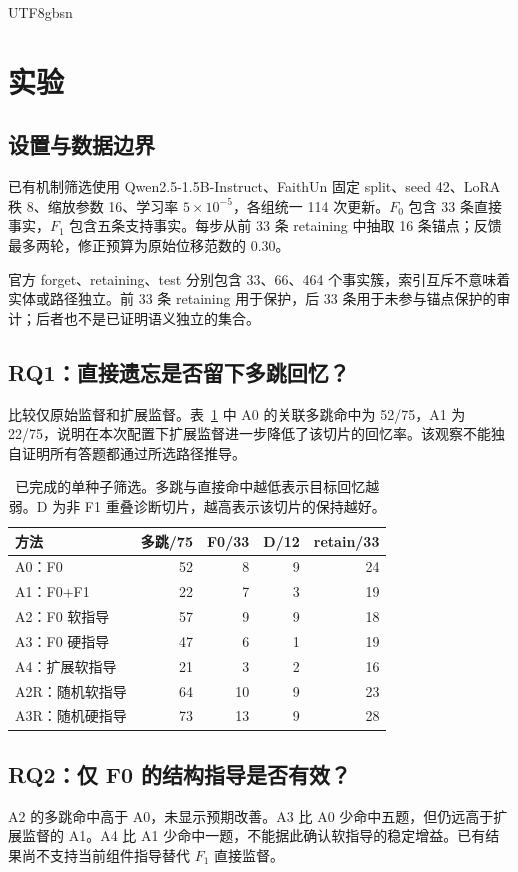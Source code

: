 \documentclass[sigconf,anonymous,review]{acmart}
\begin{document}
\begin{CJK*}{UTF8}{gbsn}
\section{实验}
\subsection{设置与数据边界}
已有机制筛选使用 Qwen2.5-1.5B-Instruct、FaithUn 固定 split、seed 42、LoRA 秩 8、缩放参数 16、学习率 $5\times10^{-5}$，各组统一 114 次更新。$F_0$ 包含 33 条直接事实，$F_1$ 包含五条支持事实。每步从前 33 条 retaining 中抽取 16 条锚点；反馈最多两轮，修正预算为原始位移范数的 0.30。

官方 forget、retaining、test 分别包含 33、66、464 个事实簇，索引互斥不意味着实体或路径独立。前 33 条 retaining 用于保护，后 33 条用于未参与锚点保护的审计；后者也不是已证明语义独立的集合。

\subsection{RQ1：直接遗忘是否留下多跳回忆？}
比较仅原始监督和扩展监督。表~\ref{tab:screen} 中 A0 的关联多跳命中为 52/75，A1 为 22/75，说明在本次配置下扩展监督进一步降低了该切片的回忆率。该观察不能独自证明所有答题都通过所选路径推导。

\begin{table}[t]
\caption{已完成的单种子筛选。多跳与直接命中越低表示目标回忆越弱。D 为非 F1 重叠诊断切片，越高表示该切片的保持越好。}
\label{tab:screen}
\centering\small
\begin{tabular}{lrrrr}
\toprule
方法 & 多跳/75 & F0/33 & D/12 & retain/33\\
\midrule
A0：F0 & 52 & 8 & 9 & 24\\
A1：F0+F1 & 22 & 7 & 3 & 19\\
A2：F0 软指导 & 57 & 9 & 9 & 18\\
A3：F0 硬指导 & 47 & 6 & 1 & 19\\
A4：扩展软指导 & 21 & 3 & 2 & 16\\
A2R：随机软指导 & 64 & 10 & 9 & 23\\
A3R：随机硬指导 & 73 & 13 & 9 & 28\\
\bottomrule
\end{tabular}
\end{table}

\subsection{RQ2：仅 F0 的结构指导是否有效？}
A2 的多跳命中高于 A0，未显示预期改善。A3 比 A0 少命中五题，但仍远高于扩展监督的 A1。A4 比 A1 少命中一题，不能据此确认软指导的稳定增益。已有结果尚不支持当前组件指导替代 $F_1$ 直接监督。


\end{CJK*}
\end{document}
